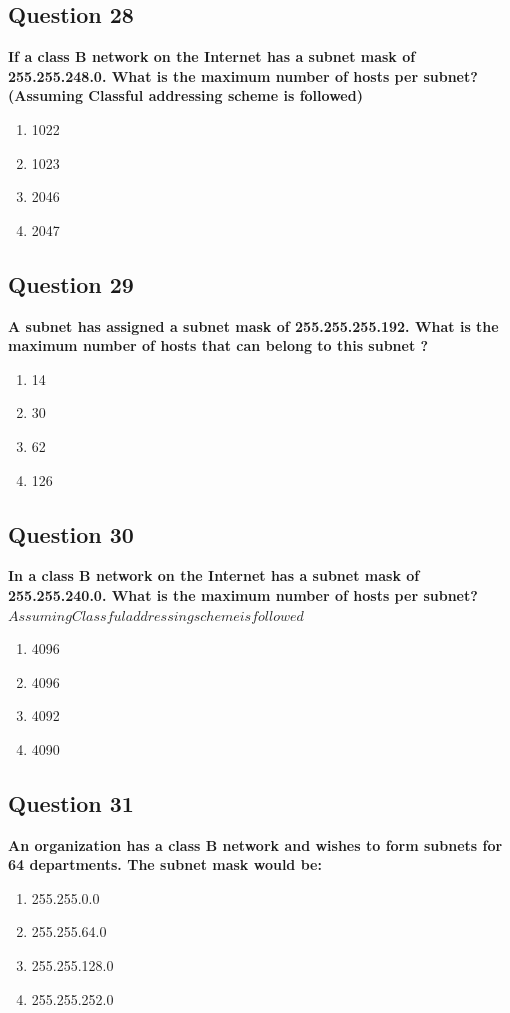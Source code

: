 \documentclass[12pt]{article}
\begin{document}
\subsection*{Question 28}
\textbf{If a class B network on the Internet has a subnet mask of 255.255.248.0. What is the maximum number of hosts per subnet? (Assuming Classful addressing scheme is followed)}
\begin{enumerate}
    \item 1022
    \item 1023
    \item 2046
    \item 2047
\end{enumerate}

\subsection*{Question 29}
\textbf{A subnet has assigned a subnet mask of 255.255.255.192. What is the maximum number of hosts that can belong to this subnet ?}
\begin{enumerate}
    \item 14
    \item 30
    \item 62
    \item 126
\end{enumerate}

\subsection*{Question 30}
\textbf{In a class B network on the Internet has a subnet mask of 255.255.240.0. What is the maximum number of hosts per subnet? \(Assuming Classful addressing scheme is followed\)}
\begin{enumerate}
    \item 4096
    \item 4096
    \item 4092
    \item 4090
\end{enumerate}

\subsection*{Question 31}
\textbf{An organization has a class B network and wishes to form subnets for 64 departments. The subnet mask would be:}
\begin{enumerate}
    \item 255.255.0.0
    \item 255.255.64.0
    \item 255.255.128.0
    \item 255.255.252.0
\end{enumerate}
\end{document}
